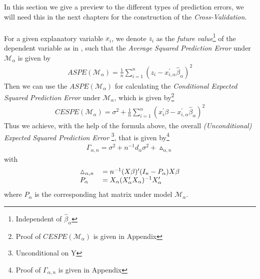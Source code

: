 \documentclass[Research_Module_ES.tex]{subfiles}
\begin{document}
In this section we give a preview to the different types of prediction errors, we will need this in the next chapters for the construction of the \textit{Cross-Validation}.\\\\
For a given explanatory variable $x_i$, we denote $z_i$ as the \textit{future value}\footnote{Independent of $\hat{\beta}_\alpha$} of the dependent variable as in \cite{shao}, such that the \textit{Average Squared Prediction Error} under $\mathcal{M}_\alpha$ is given by
\begin{align}
ASPE(\mathcal{M}_\alpha)=\frac{1}{n}\sum_{i=1}^{n}(z_i-x_{i,\alpha}^\prime\hat{\beta}_\alpha)^2 \label{ASPE}
\end{align}
Then we can use the $ASPE(\mathcal{M}_\alpha)$ for calculating the \textit{Conditional Expected Squared Prediction Error} under $\mathcal{M}_\alpha$, which is given by\footnote{Proof of $CESPE(\mathcal{M}_\alpha)$ is given in Appendix }
\begin{align*}
CESPE(\mathcal{M}_\alpha)=\sigma^2+\frac{1}{n}\sum_{i=1}^{n}(x_i^\prime\beta-x_{i,\alpha}^\prime\hat{\beta}_\alpha)^2
\end{align*}
Thus we achieve, with the help of the formula above, the overall \textit{(Unconditional) Expected Squared Prediction Error} \footnote{Unconditional on Y}, that is given by\footnote{Proof of $\Gamma_{\alpha,n}$ is given in Appendix } 
\begin{align}
\Gamma_{\alpha,n}=\sigma^2+n^{-1}d_\alpha\sigma^2+\vartriangle_{\alpha,n} 
\end{align}
with
\begin{align*}
\begin{tabular}{ll}
$\vartriangle_{\alpha,n}$&$=n^{-1}(X\beta)^\prime(I_n-P_\alpha)X\beta$\\
$P_\alpha$&$=X_\alpha(X_\alpha^\prime X_\alpha)^{-1}X_\alpha^\prime$
\end{tabular}
\end{align*} 
where $P_\alpha$ is the corresponding hat matrix under model $\mathcal{M}_\alpha$.\\
\end{document}
